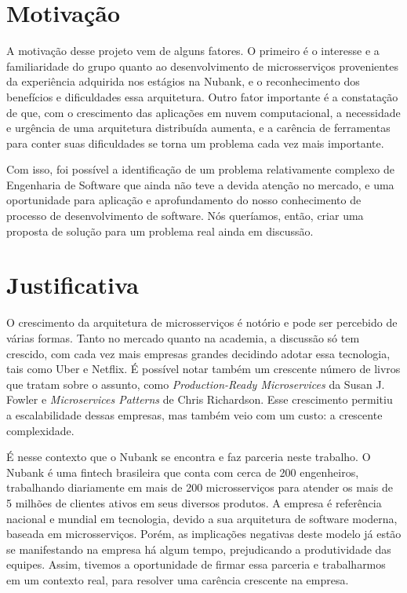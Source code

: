 \documentclass[twosideprint]{politex}
\begin{document}
	\section{Motivação}
	A motivação desse projeto vem de alguns fatores. O primeiro é o interesse e a familiaridade do grupo quanto ao desenvolvimento de microsserviços provenientes da experiência adquirida nos estágios na Nubank, e o reconhecimento dos benefícios e dificuldades essa arquitetura. Outro fator importante é a constatação de que, com o crescimento das aplicações em nuvem computacional, a necessidade e urgência de uma arquitetura distribuída aumenta, e a carência de ferramentas para conter suas dificuldades se torna um problema cada vez mais importante.
	
	Com isso, foi possível a identificação de um problema relativamente complexo de Engenharia de Software que ainda não teve a devida atenção no mercado, e uma oportunidade para aplicação e aprofundamento do nosso conhecimento de processo de desenvolvimento de software. Nós queríamos, então, criar uma proposta de solução para um problema real ainda em discussão.
	\section{Justificativa}
	O crescimento da arquitetura de microsserviços é notório e pode ser percebido de várias formas. Tanto no mercado quanto na academia, a discussão só tem crescido, com cada vez mais empresas grandes decidindo adotar essa tecnologia, tais como Uber e Netflix. É possível notar também um crescente número de livros que tratam sobre o assunto, como \textit{Production-Ready Microservices} da Susan J. Fowler\cite{productionreadyms} e \textit{Microservices Patterns} de Chris Richardson\cite{mspatterns}. Esse crescimento permitiu a escalabilidade dessas empresas, mas também veio com um custo: a crescente complexidade.
	
	É nesse contexto que o Nubank se encontra e faz parceria neste trabalho. O Nubank é uma fintech brasileira que conta com cerca de 200 engenheiros, trabalhando diariamente em mais de 200 microsserviços para atender os mais de 5 milhões de clientes ativos em seus diversos produtos. A empresa é referência nacional e mundial em tecnologia, devido a sua arquitetura de software moderna, baseada em microsserviços. Porém, as implicações negativas deste modelo já estão se manifestando na empresa há algum tempo, prejudicando a produtividade das equipes. Assim, tivemos a oportunidade de firmar essa parceria e trabalharmos em um contexto real, para resolver uma carência crescente na empresa.
	
\end{document}
